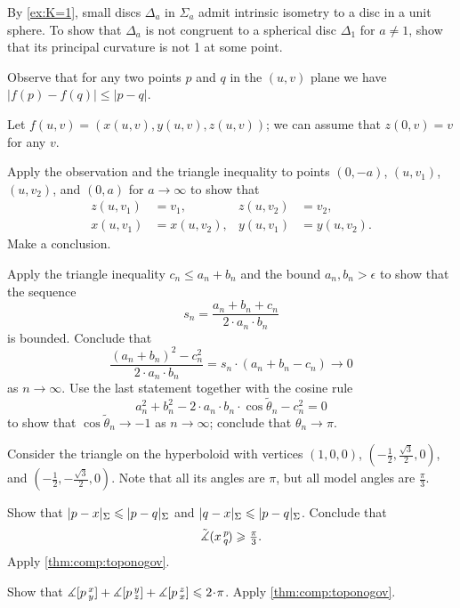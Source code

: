 \begin{multicols}{2}
By \ref{ex:K=1}, small discs $\Delta_a$ in $\Sigma_a$ admit intrinsic isometry to a disc in a unit sphere.
To show that $\Delta_a$ is not congruent to a spherical disc $\Delta_1$ for $a\ne 1$, show that its principal curvature is not 1 at some point. 


Observe that for any two points $p$ and $q$ in the $(u,v)$ plane we have $|f(p)-f(q)|\le |p-q|$.

Let $f(u,v)=(x(u,v),y(u,v),z(u,v))$;
we can assume that $z(0,v)=v$ for any $v$.

Apply the observation and the triangle inequality to points $(0,-a)$, $(u,v_1)$, $(u,v_2)$, and $(0,a)$ for $a\to \infty$ to show that 
\begin{align*}
z(u,v_1)&=v_1,
&
z(u,v_2)&=v_2,
\\
x(u,v_1)&=x(u,v_2),
&
y(u,v_1)&=y(u,v_2).
\end{align*}
Make a conclusion.



\setcounter{eqtn}{0}

Apply the triangle inequality $c_n\le a_n+b_n$ and the bound $a_n,b_n>\epsilon$ to show that the sequence 
\[s_n=\frac{a_n+b_n+c_n}{2\cdot a_n\cdot b_n}\]
is bounded.
Conclude that 
\[\frac{(a_n+b_n)^2-c_n^2}{2\cdot a_n\cdot b_n}=s_n\cdot (a_n+b_n-c_n)\to 0\]
as $n\to\infty$.
Use the last statement together with the cosine rule
\[a_n^2+b_n^2-2\cdot a_n\cdot b_n\cdot\cos\tilde\theta_n -c_n^2=0\]
to show that $\cos\tilde\theta_n\to -1$ as $n\to\infty$;
conclude that $\theta_n\to \pi$.

Consider the triangle on the hyperboloid with vertices $(1,0,0)$, $(-\tfrac{1}2, \tfrac{\sqrt{3} }2, 0)$, and $(-\tfrac{1}2, -\tfrac{\sqrt{3} }2, 0)$.
Note that all its angles are $\pi$, but all model angles are $\tfrac{\pi}3$.

Show that $\dist{p}{x}\Sigma\le \dist{p}{q}\Sigma$ and $\dist{q}{x}\Sigma\le \dist{p}{q}\Sigma$.
Conclude that
\[\tilde\measuredangle(x\,{}^{p}_{q}\hspace{-0.2ex})\geqslant \tfrac\pi3.\]
Apply \ref{thm:comp:toponogov}.

Show that 
$\measuredangle\hinge pxy+\measuredangle\hinge pyz+\measuredangle\hinge pzx\le2\cdot \pi$.
Apply \ref{thm:comp:toponogov}.


\end{multicols}
